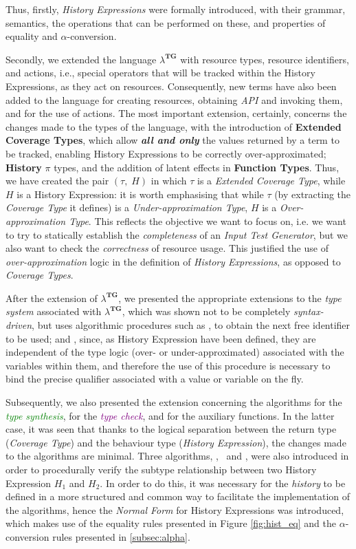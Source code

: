 Thus, firstly, \emph{History Expressions} were formally introduced, with their grammar, semantics, the operations that can be performed on these, and properties of equality and $\alpha$-conversion.

Secondly, we extended the language $\lambda^{\textbf{TG}}$ with resource types, resource identifiers, and actions, i.e., special operators that will be tracked within the History Expressions, as they act on resources. Consequently, new terms have also been added to the language for creating resources, obtaining \emph{API} and invoking them, and for the use of actions.
The most important extension, certainly, concerns the changes made to the types of the language, with the introduction of \textbf{Extended Coverage Types}, which allow \emph{\textbf{all and only}} the values returned by a term to be tracked, enabling History Expressions to be correctly over-approximated; \textbf{History} $\pi$ types, and the addition of latent effects in \textbf{Function Types}.
Thus, we have created the pair $(\tau, \;H)$ in which $\tau$ is a \emph{Extended Coverage Type}, while $H$ is a History Expression: it is worth emphasising that while $\tau$ (by extracting the \emph{Coverage Type} it defines) is a \emph{Under-approximation Type}, $H$ is a \emph{Over-approximation Type}. This reflects the objective we want to focus on, i.e. we want to try to statically establish the \emph{completeness} of an \emph{Input Test Generator}, but we also want to check the \emph{correctness} of resource usage. This justified the use of \emph{over-approximation} logic in the definition of \emph{History Expressions}, as opposed to \emph{Coverage Types}.

After the extension of $\lambda^{\textbf{TG}}$, we presented the appropriate extensions to the \emph{type system} associated with $\lambda^{\textbf{TG}}$, which was shown not to be completely \emph{syntax-driven}, but uses algorithmic procedures such as \nextd, to obtain the next free identifier to be used; and \bind, since, as History Expression have been defined, they are independent of the type logic (over- or under-approximated) associated with the variables within them, and therefore the use of this procedure is necessary to bind the precise qualifier associated with a value or variable on the fly.

Subsequently, we also presented the extension concerning the algorithms for the \emph{\textcolor{Green}{type synthesis}}, for the \emph{\textcolor{purple}{type check}}, and for the auxiliary functions. In the latter case, it was seen that thanks to the logical separation between the return type (\emph{Coverage Type}) and the behaviour type (\emph{History Expression}), the changes made to the algorithms are minimal. Three algorithms, \subhist, \subconc\ and \histconj, were also introduced in order to procedurally verify the subtype relationship between two History Expression $H_1$ and $H_2$. In order to do this, it was necessary for the \emph{history} to be defined in a more structured and common way to facilitate the implementation of the algorithms, hence the \emph{Normal Form} for History Expressions was introduced, which makes use of the equality rules presented in Figure \ref{fig:hist_eq} and the $\alpha$-conversion rules presented in \ref{subsec:alpha}.

